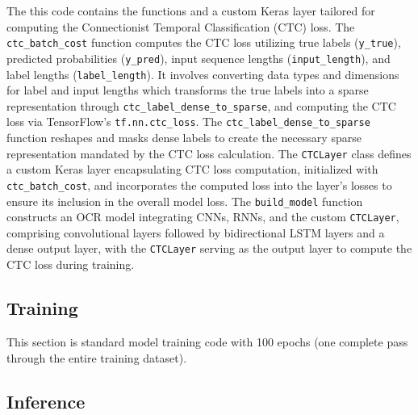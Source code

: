 \documentclass[10pt,twocolumn]{article}
\begin{document}
The this code contains the functions and a custom Keras layer tailored for computing the Connectionist Temporal Classification (CTC) loss. The \texttt{ctc\_batch\_cost} function computes the CTC loss utilizing true labels (\texttt{y\_true}), predicted probabilities (\texttt{y\_pred}), input sequence lengths (\texttt{input\_length}), and label lengths (\texttt{label\_length}). It involves converting data types and dimensions for label and input lengths which transforms the true labels into a sparse representation through \texttt{ctc\_label\_dense\_to\_sparse}, and computing the CTC loss via TensorFlow's \texttt{tf.nn.ctc\_loss}. The \texttt{ctc\_label\_dense\_to\_sparse} function reshapes and masks dense labels to create the necessary sparse representation mandated by the CTC loss calculation. The \texttt{CTCLayer} class defines a custom Keras layer encapsulating CTC loss computation, initialized with \texttt{ctc\_batch\_cost}, and incorporates the computed loss into the layer's losses to ensure its inclusion in the overall model loss. The \texttt{build\_model} function constructs an OCR model integrating CNNs, RNNs, and the custom \texttt{CTCLayer}, comprising convolutional layers followed by bidirectional LSTM layers and a dense output layer, with the \texttt{CTCLayer} serving as the output layer to compute the CTC loss during training. 



\subsection{Training}

This section is standard model training code with 100 epochs (one complete pass through the entire training dataset).


\subsection{Inference}
\end{document}
